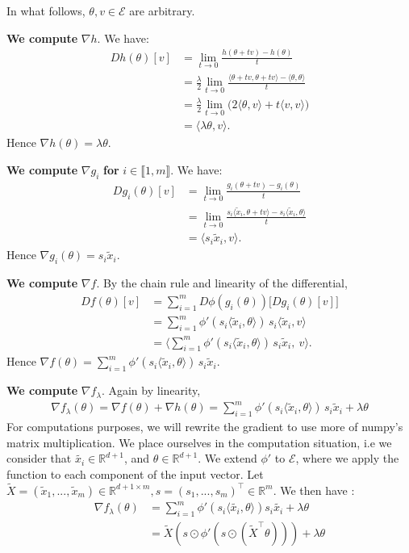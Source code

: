 \documentclass[a4paper,12pt]{article}
\newcommand{\E}{\mathcal{E}}
\newcommand{\xt}{\tilde{x}}
\newcommand{\grad}{\nabla}
\begin{document}
In what follows, $\theta, v \in \E$ are arbitrary.

\textbf{We compute} $\grad h$.
We have:
\begin{align*}
Dh(\theta)[v] &= \lim_{t\to 0} \frac{h(\theta + tv) - h(\theta)}{t} \\
      &= \frac{\lambda}{2} \lim_{t\to 0} \frac{\langle \theta + tv, \theta +tv \rangle - \langle \theta, \theta \rangle}{t} \\
      &= \frac{\lambda}{2} \lim_{t\to 0} \big( 2\langle \theta, v \rangle + t\langle v, v \rangle \big) \\
      &= \langle \lambda \theta, v \rangle.
\end{align*}
Hence $\grad h(\theta) = \lambda \theta$.

\textbf{We compute} $\grad g_i$ \textbf{for} $i\in \llbracket 1,m\rrbracket$.
We have:
\begin{align*}
    D g_i(\theta)[v] &= \lim_{t\to 0} \frac{g_i(\theta + tv) - g_i(\theta)}{t} \\
                     &= \lim_{t\to 0} \frac{s_i \langle \xt_i, \theta + tv\rangle - s_i \langle \xt_i, \theta \rangle}{t} \\
                     &= \langle s_i \xt_i, v\rangle.
\end{align*}
Hence $\grad g_i(\theta) = s_i \xt_i$.

\textbf{We compute} $\grad f$.
By the chain rule and linearity of the differential,
\begin{align*}
   Df(\theta)[v] &= \sum_{i=1}^m D\phi(g_i(\theta))\big[D g_i(\theta)[v]\big] \\
                 &= \sum_{i=1}^m \phi'(s_i \langle \xt_i, \theta \rangle)\, s_i \langle \xt_i,v\rangle \\
                  &= \Big\langle \sum_{i=1}^m \phi'(s_i \langle \xt_i, \theta \rangle)\, s_i \xt_i,\ v \Big\rangle.
\end{align*}
Hence $\grad f(\theta) = \displaystyle \sum_{i=1}^m \phi'(s_i \langle \xt_i, \theta \rangle)\, s_i \xt_i$.

\textbf{We compute} $\grad f_{\lambda}$.
Again by linearity,
\begin{align*}
\grad f_{\lambda}(\theta) = \grad f(\theta) + \grad h(\theta) = \sum_{i=1}^m \phi'(s_i \langle \xt_i, \theta \rangle)\, s_i \xt_i + \lambda \theta
\end{align*}
For computations purposes, we will rewrite the gradient to use more of numpy's matrix multiplication. 
We place ourselves in the computation situation, i.e we consider that $\tilde{x_i} \in \mathbb R^{d+1}$, and $\theta \in \mathbb R^{d+1}$. 
We extend $\phi'$ to $\mathcal E$, where we apply the function to each component of the input vector.
Let $\tilde{X} = (\tilde{x}_1, ..., \tilde{x}_m) \in \mathbb R^{d+1 \times m}, s = (s_1,...,s_m)^\top \in \mathbb R^m$.
We then have : 
\begin{align*}
    \grad f_{\lambda}(\theta) &= \sum_{i=1}^m \phi'(s_i \langle \tilde{x_i}, \theta \rangle) s_i \tilde{x_i} + \lambda \theta \\ 
                              &= \tilde X (s\odot \phi'(s \odot (\tilde{X}^\top \theta))) + \lambda \theta 
\end{align*}
\end{document}
